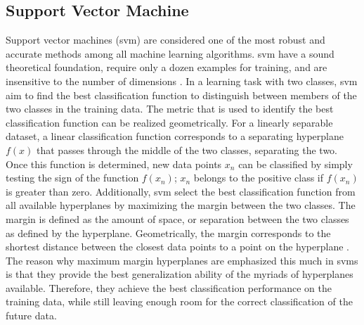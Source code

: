 \subsection{Support Vector Machine}
Support vector machines (\gls{svm}) are considered one of the most robust and accurate methods among all machine learning algorithms. \gls{svm} have a sound theoretical foundation, require only a dozen examples for training,
and are insensitive to the number of dimensions \cite{Wu2008}.
In a learning task with two classes, \gls{svm} aim to find the best classification function to distinguish between members of the two classes in the training data. The metric that is used to identify the best classification function can be realized geometrically. For a linearly separable
dataset, a linear classification function corresponds to a separating hyperplane $f(x)$ that passes through the middle of the two classes, separating the two. Once this function is determined, new data points $x_{n}$ can be classified by simply testing the sign of the function
$f(x_{n})$; $x_{n}$ belongs to the positive class if $f(x_{n})$ is greater than zero.
Additionally, \gls{svm} select the best classification function from all available hyperplanes by maximizing the margin between the two classes.
The margin is defined as the amount of space, or separation between the two classes as defined by the hyperplane. Geometrically, the margin corresponds to the shortest distance between the closest data points to a point on the hyperplane \cite{Wu2008}. The reason why maximum margin hyperplanes are emphasized this much in \gls{svm}s is that they provide the best generalization ability of the myriads of hyperplanes available. Therefore, they achieve the best classification performance on the training data, while still leaving enough room for the correct classification of the future data.

